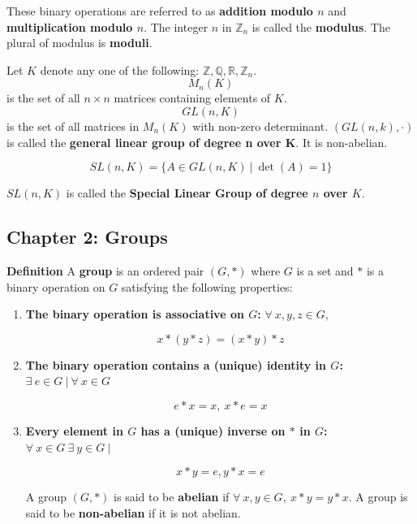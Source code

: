 \documentclass{article}
\begin{document}
These binary operations are referred to as \textbf{addition modulo \(n\)} and \textbf{multiplication modulo \(n\)}. The integer \(n\) in \(\mathbb{Z}_n\) is called the \textbf{modulus}. The plural of modulus is \textbf{moduli}.

Let \(K\) denote any one of the following: \(\mathbb{Z}, \mathbb{Q}, \mathbb{R}, \mathbb{Z}_n\). \[M_n(K)\] is the set of all \(n \times n\) matrices containing elements of \(K\). \[GL(n, K)\] is the set of all matrices in \(M_{n}(K)\) with non-zero determinant. \((GL(n, k), \cdot)\) is called the \textbf{general linear group of degree n over K}. It is non-abelian.

\[
SL(n, K) = \{A \in GL(n, K) \ | \ \det(A) = 1\}
\]

\(SL(n, K)\) is called the \textbf{Special Linear Group of degree \(n\) over \(K\)}.

\pagebreak

\subsection{Chapter 2: Groups}

\textbf{Definition} A \textbf{group} is an ordered pair \((G, *)\) where \(G\) is a set and \(*\) is a binary operation on \(G\) satisfying the following properties:

\begin{enumerate}[1.]

\item \textbf{The binary operation is associative on \(G\):} \(\forall \ x, y , z \in G\), 

\[
x * (y * z) = (x * y) * z
\]

\item \textbf{The binary operation contains a (unique) identity in \(G\):} \(\exists \ e \in G \ | \ \forall \ x  \in  G\)

\[
e * x = x, \ x * e = x 
\]

\item \textbf{Every element in \(G\) has a (unique) inverse on \(*\) in \(G\):} \(\forall \ x \in G \ \exists \ y \in G \ |\)

\[
x*y = e, y*x =e
\]

A group \( (G, *)\) is said to be \textbf{abelian} if \(\forall \ x, y \in G, \ x*y = y*x\). A group is said to be \textbf{non-abelian} if it is not abelian.

\end{enumerate}
\end{document}
